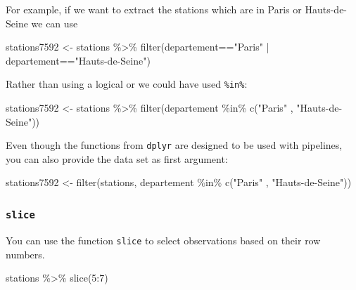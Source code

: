 \documentclass[
]{book}
\newenvironment{Shaded}{\begin{snugshade}}{\end{snugshade}}
\newcommand{\DecValTok}[1]{\textcolor[rgb]{0.00,0.00,0.81}{#1}}
\newcommand{\FunctionTok}[1]{\textcolor[rgb]{0.00,0.00,0.00}{#1}}
\newcommand{\NormalTok}[1]{#1}
\newcommand{\OtherTok}[1]{\textcolor[rgb]{0.56,0.35,0.01}{#1}}
\newcommand{\SpecialCharTok}[1]{\textcolor[rgb]{0.00,0.00,0.00}{#1}}
\newcommand{\StringTok}[1]{\textcolor[rgb]{0.31,0.60,0.02}{#1}}
\begin{document}
For example, if we want to extract the stations which are in Paris or Hauts-de-Seine we can use

\begin{Shaded}
\begin{Highlighting}[]
\NormalTok{stations7592 }\OtherTok{\textless{}{-}}\NormalTok{ stations }\SpecialCharTok{\%\textgreater{}\%}
                  \FunctionTok{filter}\NormalTok{(departement}\SpecialCharTok{==}\StringTok{"Paris"} \SpecialCharTok{|}\NormalTok{ departement}\SpecialCharTok{==}\StringTok{"Hauts{-}de{-}Seine"}\NormalTok{)}
\end{Highlighting}
\end{Shaded}

Rather than using a logical or we could have used \texttt{\%in\%}:

\begin{Shaded}
\begin{Highlighting}[]
\NormalTok{stations7592 }\OtherTok{\textless{}{-}}\NormalTok{ stations }\SpecialCharTok{\%\textgreater{}\%}
                  \FunctionTok{filter}\NormalTok{(departement }\SpecialCharTok{\%in\%} \FunctionTok{c}\NormalTok{(}\StringTok{"Paris"}\NormalTok{ , }\StringTok{"Hauts{-}de{-}Seine"}\NormalTok{))}
\end{Highlighting}
\end{Shaded}

Even though the functions from \texttt{dplyr} are designed to be used with pipelines, you can also provide the data set as first argument:

\begin{Shaded}
\begin{Highlighting}[]
\NormalTok{stations7592 }\OtherTok{\textless{}{-}} \FunctionTok{filter}\NormalTok{(stations, departement }\SpecialCharTok{\%in\%} \FunctionTok{c}\NormalTok{(}\StringTok{"Paris"}\NormalTok{ , }\StringTok{"Hauts{-}de{-}Seine"}\NormalTok{))}
\end{Highlighting}
\end{Shaded}

\hypertarget{slice}{%
\subsubsection{\texorpdfstring{\texttt{slice}}{slice}}\label{slice}}

You can use the function \texttt{slice} to select observations based on their row numbers.

\begin{Shaded}
\begin{Highlighting}[]
\NormalTok{stations }\SpecialCharTok{\%\textgreater{}\%}
  \FunctionTok{slice}\NormalTok{(}\DecValTok{5}\SpecialCharTok{:}\DecValTok{7}\NormalTok{)}
\end{Highlighting}
\end{Shaded}
\end{document}
